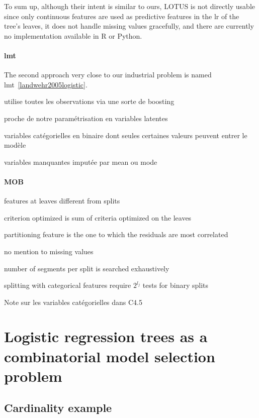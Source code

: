 To sum up, although their intent is similar to ours, LOTUS is not directly usable since only continuous features are used as predictive features in the \gls{lr} of the tree's leaves, it does not handle missing values gracefully, and there are currently no implementation available in \textsf{R} or Python.

\paragraph{\gls{lmt}}

The second approach very close to our industrial problem is named \gls{lmt}~\ref{landwehr2005logistic}.

utilise toutes les observations via une sorte de boosting

proche de notre paramétrisation en variables latentes

variables catégorielles en binaire dont seules certaines valeurs peuvent entrer le modèle

variables manquantes imputée par mean ou mode



\paragraph{MOB}

features at leaves different from splits

criterion optimized is sum of criteria optimized on the leaves

partitioning feature is the one to which the residuals are most correlated

no mention to missing values

number of segments per split is searched exhaustively

splitting with categorical features require $2^{l_j}$ tests for binary splits


Note sur les variables catégorielles dans C4.5




\section{Logistic regression trees as a combinatorial model selection problem} \label{sec:model_selec_tree}


\subsection{Cardinality example}


